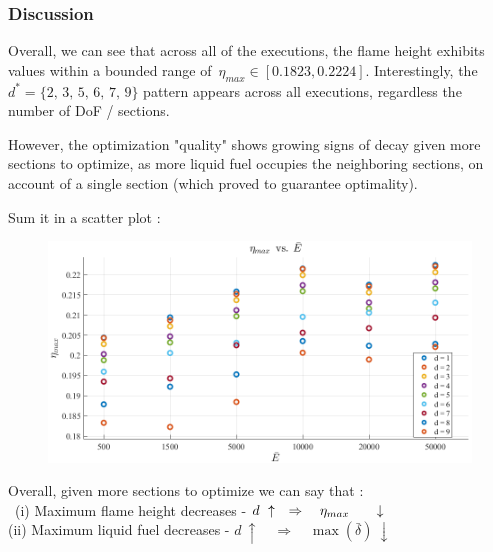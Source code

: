 \documentclass[12pt]{article}
\numberwithin{equation}{section}
\begin{document}
\begin{flushleft}
\subsubsection{Discussion}
Overall, we can see that across all of the executions, the flame height exhibits values within a bounded range of \,$\eta_{max} \in [ 0.1823 , 0.2224 ]$. Interestingly, the $d^* = \{2, \, 3, \, 5, \, 6, \, 7, \, 9  \}$ pattern appears across all executions, regardless the number of DoF / sections. 

However, the optimization "quality" shows growing signs of decay given more sections to optimize, as more liquid fuel occupies the neighboring sections, on account of a single section (which proved to guarantee optimality).

Sum it in a scatter plot :
\begin{figure}[H]
\centering
\includegraphics[width=1.0 \linewidth, center]{eta_max_table.png}
\end{figure}
Overall, given more sections to optimize we can say that : \\
\quad \, (i) Maximum flame height decreases - \hspace{9mm} $d \ \uparrow \quad \Rightarrow \quad \eta_{max} \hspace{6mm} \downarrow$ \\
\hspace{3.75mm} (ii) Maximum liquid fuel decreases - \hspace{13mm} $d \ \uparrow \quad \Rightarrow \quad \max(\bar{\delta}) \ \downarrow$


\end{flushleft}
\end{document}
